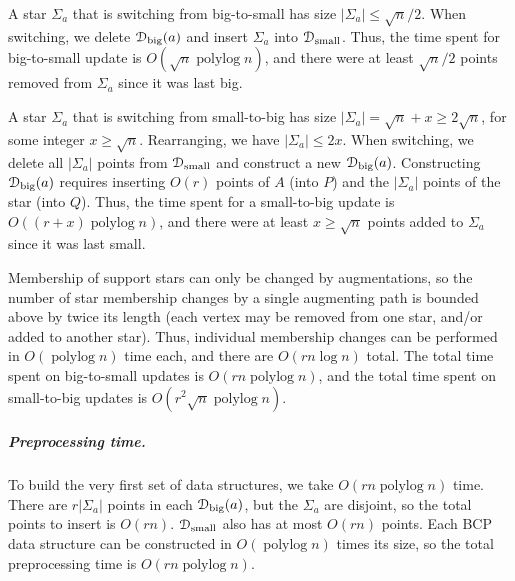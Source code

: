 \documentclass[a4paper,UKenglish]{socg-lipics-v2018}
\def\polylog{\mathop{\mathrm{polylog}}}
\def\abs#1{\mathopen| #1 \mathclose|}		%
\theoremstyle{plain}
\numberwithin{figure}{section}
\renewcommand{\paragraph}{\subparagraph}
\begin{document}
A star $\Sigma_a$ that is switching from big-to-small has size
$\abs{\Sigma_a} \leq \sqrt{n}/2$.
When switching, we delete $\EuScript{D}_\text{big}(a)$ and insert $\Sigma_a$
into $\EuScript{D}_\text{small}$.
Thus, the time spent for big-to-small update is $O(\sqrt{n}\polylog n)$,
and there were at least $\sqrt{n}/2$ points removed from $\Sigma_a$ since it
was last big.

A star $\Sigma_a$ that is switching from small-to-big has size
$\abs{\Sigma_a} = \sqrt{n} + x \geq 2\sqrt{n}$, for some integer
$x \geq \sqrt{n}$.
Rearranging, we have $\abs{\Sigma_a} \leq 2x$.
When switching, we delete all $\abs{\Sigma_a}$ points from
$\EuScript{D}_\text{small}$ and construct a new $\EuScript{D}_\text{big}(a)$.
Constructing $\EuScript{D}_\text{big}(a)$ requires inserting $O(r)$ points of
$A$ (into $P$) and the $\abs{\Sigma_a}$ points of the star (into $Q$).
Thus, the time spent for a small-to-big update is $O((r + x)\polylog n)$,
and there were at least $x \geq \sqrt{n}$ points added to $\Sigma_a$ since it
was last small.

Membership of support stars can only be changed by augmentations,
so the number of star membership changes by a single augmenting path is
bounded above by twice its length (each vertex may be removed from one star,
and/or added to another star).
Thus, individual membership changes can be performed in $O(\polylog n)$ time
each, and there are $O(rn\log n)$ total.
The total time spent on big-to-small updates is $O(rn\polylog n)$, and the
total time spent on small-to-big updates is $O(r^2\sqrt{n}\polylog n)$.

\paragraph{Preprocessing time.}
To build the very first set of data structures, we take $O(rn\polylog n)$ time.
There are $r\abs{\Sigma_a}$ points in each $\EuScript{D}_\text{big}(a)$,
but the $\Sigma_a$ are disjoint, so the total points to insert is $O(rn)$.
$\EuScript{D}_\text{small}$ also has at most $O(rn)$ points.
Each BCP data structure can be constructed in $O(\polylog n)$ times its size,
so the total preprocessing time is $O(rn\polylog n)$.
\end{document}
